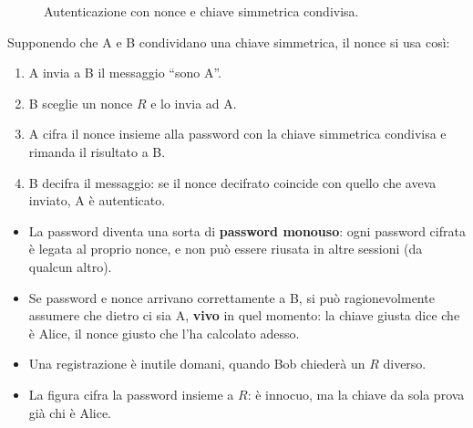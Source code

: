 
\begin{figure}[H]
\centering
{}
\caption{Autenticazione con nonce e chiave simmetrica condivisa.}
\end{figure}

Supponendo che A e B condividano una chiave simmetrica, il nonce si usa così:

\begin{enumerate}
    \item A invia a B il messaggio ``sono A''.
    \item B sceglie un nonce $R$ e lo invia ad A.
    \item A cifra il nonce insieme alla password con la chiave simmetrica condivisa e rimanda il risultato a B.
    \item B decifra il messaggio: se il nonce decifrato coincide con quello che aveva inviato, A è autenticato.
\end{enumerate}

\begin{itemize}
    \item La password diventa una sorta di \textbf{password monouso}: ogni password cifrata è legata al proprio nonce, e non può essere riusata in altre
          sessioni (da qualcun altro).
    \item Se password e nonce arrivano correttamente a B, si può ragionevolmente assumere che dietro ci sia A, \textbf{vivo} in quel momento:
          la chiave giusta dice che è Alice, il nonce giusto che l'ha calcolato adesso.
    \item Una registrazione è inutile domani, quando Bob chiederà un $R$ diverso.
    \item La figura cifra la password insieme a $R$: è innocuo, ma la chiave da sola prova già chi è Alice.
\end{itemize}

